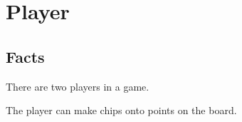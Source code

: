 \section{Player}

\subsection{Facts}

\begin{dashed}
    \item There are two players in a game.
    \item The player can make chips onto points on the board.
\end{dashed}

